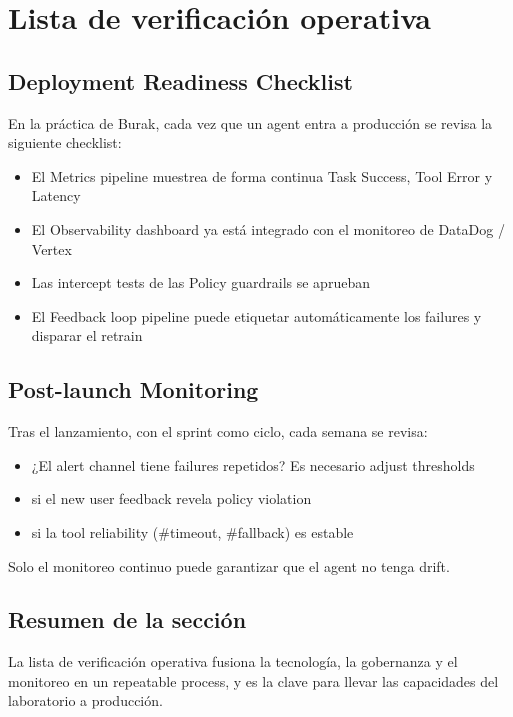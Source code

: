 \section{Lista de verificación operativa}

\subsection{Deployment Readiness Checklist}

En la práctica de Burak, cada vez que un agent entra a producción se revisa la siguiente checklist:

\begin{itemize}
    \item El Metrics pipeline muestrea de forma continua Task Success, Tool Error y Latency
    \item El Observability dashboard ya está integrado con el monitoreo de DataDog / Vertex
    \item Las intercept tests de las Policy guardrails se aprueban
    \item El Feedback loop pipeline puede etiquetar automáticamente los failures y disparar el retrain
\end{itemize}

\subsection{Post-launch Monitoring}

Tras el lanzamiento, con el sprint como ciclo, cada semana se revisa:

\begin{itemize}
    \item ¿El alert channel tiene failures repetidos? Es necesario adjust thresholds
    \item si el new user feedback revela policy violation
    \item si la tool reliability (\#timeout, \#fallback) es estable
\end{itemize}

Solo el monitoreo continuo puede garantizar que el agent no tenga drift.

\subsection{Resumen de la sección}

La lista de verificación operativa fusiona la tecnología, la gobernanza y el monitoreo en un repeatable process, y es la clave para llevar las capacidades del laboratorio a producción.

